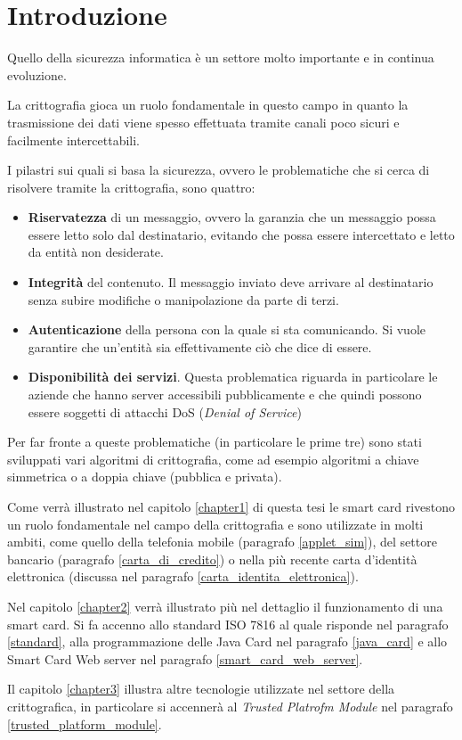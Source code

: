 \chapter*{Introduzione}
\label{introduction}
Quello della sicurezza informatica è un settore molto importante e in continua evoluzione.

La crittografia gioca un ruolo fondamentale in questo campo in quanto la trasmissione dei dati viene spesso effettuata tramite canali poco sicuri e facilmente intercettabili.

I pilastri sui quali si basa la sicurezza, ovvero le problematiche che si cerca di risolvere tramite la crittografia, sono quattro:

\begin{itemize}
    \item \textbf{Riservatezza} di un messaggio, ovvero la garanzia che un messaggio possa essere letto solo dal destinatario, evitando che possa essere intercettato e letto da entità non desiderate.
    \item \textbf{Integrità} del contenuto. Il messaggio inviato deve arrivare al destinatario senza subire modifiche o manipolazione da parte di terzi.
    \item \textbf{Autenticazione} della persona con la quale si sta comunicando. Si vuole garantire che un'entità sia effettivamente ciò che dice di essere.
    \item \textbf{Disponibilità dei servizi}. Questa problematica riguarda in particolare le aziende che hanno server accessibili pubblicamente e che quindi possono essere soggetti di attacchi DoS (\textit{Denial of Service})
\end{itemize}

Per far fronte a queste problematiche (in particolare le prime tre) sono stati sviluppati vari algoritmi di crittografia, come ad esempio algoritmi a chiave simmetrica o a doppia chiave (pubblica e privata).

Come verrà illustrato nel capitolo \ref{chapter1} di questa tesi le smart card rivestono un ruolo fondamentale nel campo della crittografia e sono utilizzate in molti ambiti, come quello della telefonia mobile (paragrafo \ref{applet_sim}), del settore bancario (paragrafo \ref{carta_di_credito}) o nella più recente carta d'identità elettronica (discussa nel paragrafo \ref{carta_identita_elettronica}).

Nel capitolo \ref{chapter2} verrà illustrato più nel dettaglio il funzionamento di una smart card. Si fa accenno allo standard ISO 7816 al quale risponde nel paragrafo \ref{standard}, alla programmazione delle Java Card nel paragrafo \ref{java_card} e allo Smart Card Web server nel paragrafo \ref{smart_card_web_server}.

Il capitolo \ref{chapter3} illustra altre tecnologie utilizzate nel settore della crittografica, in particolare si accennerà al \textit{Trusted Platrofm Module} nel paragrafo \ref{trusted_platform_module}.

